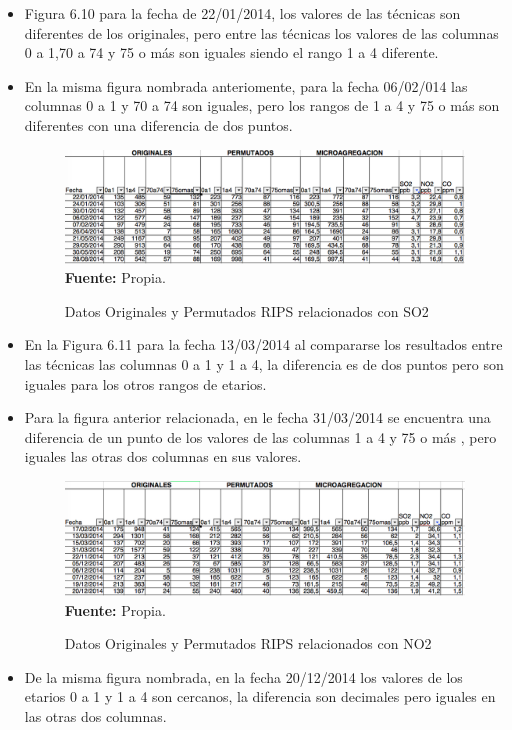 \documentclass[a4paper,openright,12pt]{book}
\theoremstyle{definition}
\theoremstyle{remark}
\begin{document}
\begin{itemize}
	\item Figura 6.10 para la fecha de 22/01/2014, los valores de las técnicas son diferentes de los originales, pero  entre las técnicas los valores de las columnas 0 a 1,70 a 74 y 75 o más son iguales siendo el rango 1 a 4 diferente.
    \item En la misma figura nombrada anteriomente,  para la fecha 06/02/014 las columnas 0 a 1 y 70 a 74 son iguales, pero  los rangos de 1 a 4 y 75 o más son diferentes con una diferencia de dos puntos.
\begin{figure}[ht]
\centering
\caption{Datos Originales y Permutados RIPS relacionados con SO2} 
\includegraphics[scale=0.45]{Puente_Aranda/SO2_Puente_Aranda}
\label{fig:Tabla1}
\\ \textbf{Fuente: }Propia.
\end{figure}
    \item En la Figura 6.11 para la fecha 13/03/2014 al compararse los resultados entre las técnicas las columnas 0 a 1 y 1 a 4, la diferencia es de dos puntos  pero son iguales para los otros rangos de etarios.
    \item Para la figura anterior relacionada, en le fecha 31/03/2014 se encuentra una diferencia de un punto de los valores de las columnas 1 a 4 y 75 o más , pero iguales las otras dos columnas en sus valores.
\begin{figure}[ht]
\centering
\caption{Datos Originales y Permutados RIPS relacionados con NO2} 
\includegraphics[scale=0.45]{Puente_Aranda/NO2_Puente_Aranda}
\label{fig:Tabla1}
\\ \textbf{Fuente: }Propia.
\end{figure}
    \item De la misma figura nombrada, en la fecha 20/12/2014 los valores de los etarios 0 a 1 y 1 a 4 son cercanos, la diferencia son decimales pero iguales en las otras dos columnas.

\end{itemize}
\end{document}
